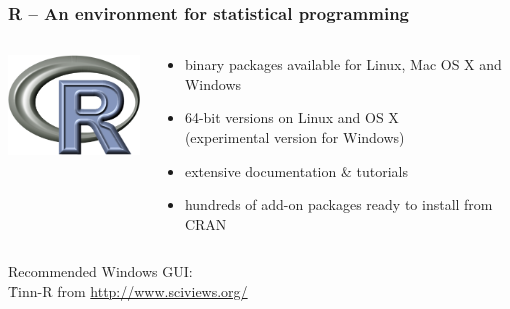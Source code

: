 \documentclass[t]{beamer} %
\begin{document}
\begin{frame}
  \frametitle{\textbf{R} -- An environment for statistical programming}
  
  \vspace{5mm}
  \begin{columns}[c]
    \begin{column}{35mm}
      \includegraphics[width=4cm]{img/Rlogo}
    \end{column}
    \begin{column}{7cm}
      \begin{itemize}
      \item binary packages available for Linux, Mac OS X and Windows
      \item 64-bit versions on Linux and OS X\\ (experimental version for Windows)
      \item extensive documentation \& tutorials
      \item hundreds of add-on packages ready to install from CRAN
      \end{itemize}
    \end{column}
  \end{columns}
  \vspace{8mm}
  \begin{center}
    
    \vspace{6mm}
    Recommended Windows GUI:\\
    \h{Tinn-R} from \url{http://www.sciviews.org/}
  \end{center}
\end{frame}
\end{document}
